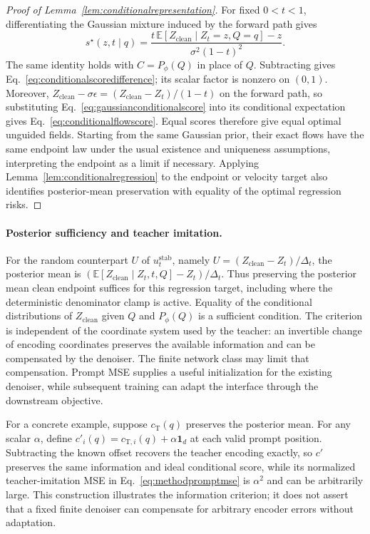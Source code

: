 \documentclass{article}
\newcommand{\E}{\mathbb{E}}
\begin{document}
\begin{proof}[Proof of Lemma~\ref{lem:conditionalrepresentation}]
For fixed $0<t<1$, differentiating the Gaussian mixture induced by the forward path gives
\begin{equation}
 s^\star(z,t\mid q)
 =\frac{t\,\E[Z_{\mathrm{clean}}\mid Z_t=z,Q=q]-z}{\sigma^2(1-t)^2}.
 \label{eq:gaussianconditionalscore}
\end{equation}
The same identity holds with $C=P_\phi(Q)$ in place of $Q$. Subtracting gives Eq.~\eqref{eq:conditionalscoredifference}; its scalar factor is nonzero on $(0,1)$. Moreover, $Z_{\mathrm{clean}}-\sigma\epsilon=(Z_{\mathrm{clean}}-Z_t)/(1-t)$ on the forward path, so substituting Eq.~\eqref{eq:gaussianconditionalscore} into its conditional expectation gives Eq.~\eqref{eq:conditionalflowscore}. Equal scores therefore give equal optimal unguided fields. Starting from the same Gaussian prior, their exact flows have the same endpoint law under the usual existence and uniqueness assumptions, interpreting the endpoint as a limit if necessary. Applying Lemma~\ref{lem:conditionalregression} to the endpoint or velocity target also identifies posterior-mean preservation with equality of the optimal regression risks.
\end{proof}

\paragraph{Posterior sufficiency and teacher imitation.}
For the random counterpart $U$ of $u_t^{\mathrm{stab}}$, namely $U=(Z_{\mathrm{clean}}-Z_t)/\Delta_t$, the posterior mean is $(\E[Z_{\mathrm{clean}}\mid Z_t,t,Q]-Z_t)/\Delta_t$. Thus preserving the posterior mean clean endpoint suffices for this regression target, including where the deterministic denominator clamp is active. Equality of the conditional distributions of $Z_{\mathrm{clean}}$ given $Q$ and $P_\phi(Q)$ is a sufficient condition. The criterion is independent of the coordinate system used by the teacher: an invertible change of encoding coordinates preserves the available information and can be compensated by the denoiser. The finite network class may limit that compensation. Prompt MSE supplies a useful initialization for the existing denoiser, while subsequent training can adapt the interface through the downstream objective.

For a concrete example, suppose $c_{\mathrm T}(q)$ preserves the posterior mean. For any scalar $\alpha$, define $c'_i(q)=c_{\mathrm T,i}(q)+\alpha\mathbf 1_d$ at each valid prompt position. Subtracting the known offset recovers the teacher encoding exactly, so $c'$ preserves the same information and ideal conditional score, while its normalized teacher-imitation MSE in Eq.~\eqref{eq:methodpromptmse} is $\alpha^2$ and can be arbitrarily large. This construction illustrates the information criterion; it does not assert that a fixed finite denoiser can compensate for arbitrary encoder errors without adaptation.
\end{document}
